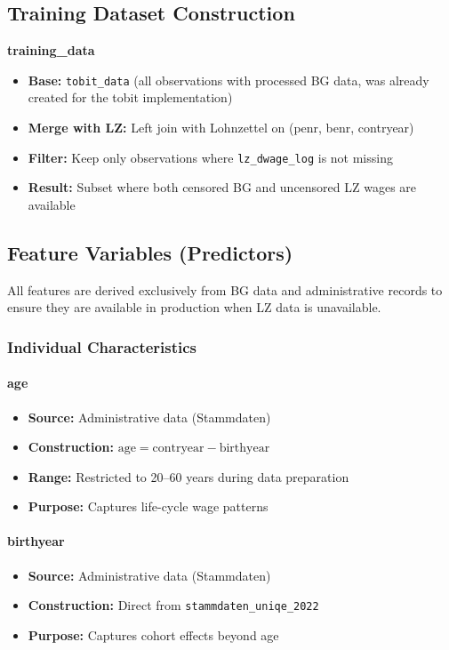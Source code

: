 \documentclass{article}
\begin{document}
\subsection{Training Dataset Construction}

\textbf{training\_data}
\begin{itemize}
    \item \textbf{Base:} \texttt{tobit\_data} (all observations with processed BG data, was already created for the tobit implementation)
    \item \textbf{Merge with LZ:} Left join with Lohnzettel on (penr, benr, contryear)
    \item \textbf{Filter:} Keep only observations where \texttt{lz\_dwage\_log} is not missing
    \item \textbf{Result:} Subset where both censored BG and uncensored LZ wages are available
\end{itemize}

\subsection{Feature Variables (Predictors)}

All features are derived exclusively from BG data and administrative records to ensure they are available in production when LZ data is unavailable.

\subsubsection{Individual Characteristics}

\paragraph{age}
\begin{itemize}
    \item \textbf{Source:} Administrative data (Stammdaten)
    \item \textbf{Construction:} $\text{age} = \text{contryear} - \text{birthyear}$
    \item \textbf{Range:} Restricted to 20--60 years during data preparation
    \item \textbf{Purpose:} Captures life-cycle wage patterns
\end{itemize}

\paragraph{birthyear}
\begin{itemize}
    \item \textbf{Source:} Administrative data (Stammdaten)
    \item \textbf{Construction:} Direct from \texttt{stammdaten\_uniqe\_2022}
    \item \textbf{Purpose:} Captures cohort effects beyond age
\end{itemize}
\end{document}
